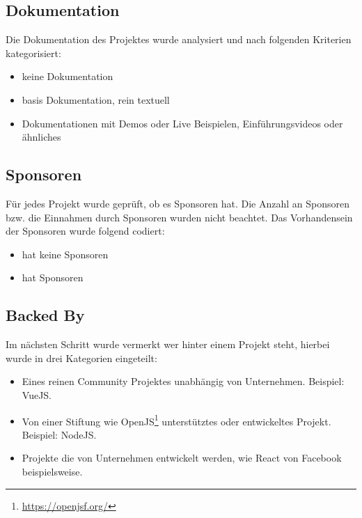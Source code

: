 \subsection{Dokumentation} \label{ssec:manuelle_datenerfassung_dokumentation}
Die Dokumentation des Projektes wurde analysiert und nach folgenden Kriterien kategorisiert:

\begin{itemize}[noitemsep]
    \item[0 =] keine Dokumentation
    \item[1 =] basis Dokumentation, rein textuell
    \item[2 =] Dokumentationen mit Demos oder Live Beispielen,
        Einführungsvideos oder ähnliches
\end{itemize}


\subsection{Sponsoren}
Für jedes Projekt wurde geprüft, ob es Sponsoren hat. Die Anzahl an Sponsoren bzw. die Einnahmen
durch Sponsoren wurden nicht beachtet. Das Vorhandensein der Sponsoren wurde folgend codiert:

\begin{itemize}[noitemsep]
    \item[0 =] hat keine Sponsoren
    \item[1 =] hat Sponsoren
\end{itemize}


\newpage %
\subsection{Backed By}
Im nächsten Schritt wurde vermerkt wer hinter einem Projekt steht, hierbei wurde in drei Kategorien
eingeteilt:

\begin{itemize}[noitemsep]
    \item[0 =] Eines reinen Community Projektes unabhängig von Unternehmen. Beispiel: VueJS.
    \item[1 =] Von einer Stiftung wie OpenJS\footnote{\url{https://openjsf.org/}} unterstütztes oder
        entwickeltes Projekt.\\ Beispiel: NodeJS.
    \item[2 =] Projekte die von Unternehmen entwickelt werden, wie React von Facebook beispielsweise.
\end{itemize}

